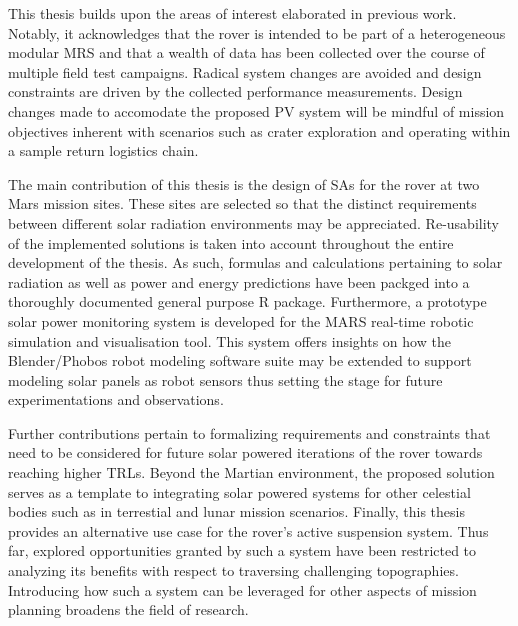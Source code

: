 This thesis builds upon the areas of interest elaborated in previous work. Notably, it acknowledges that the rover is intended to be part of a heterogeneous modular \ac{MRS} and that a wealth of data has been collected over the course of multiple field test campaigns. Radical system changes are avoided and design constraints are driven by the collected performance measurements. Design changes made to accomodate the proposed \ac{PV} system will be mindful of mission objectives inherent with scenarios such as crater exploration and operating within a sample return logistics chain.

The main contribution of this thesis is the design of \acp{SA} for the rover at two Mars mission sites. These sites are selected so that the distinct requirements between different solar radiation environments may be appreciated. Re-usability of the implemented solutions is taken into account throughout the entire development of the thesis. As such, formulas and calculations pertaining to solar radiation as well as power and energy predictions have been packged into a thoroughly documented general purpose R package. Furthermore, a prototype solar power monitoring system is developed for the MARS real-time robotic simulation and visualisation tool. This system offers insights on how the Blender/Phobos robot modeling software suite may be extended to support modeling solar panels as robot sensors thus setting the stage for future experimentations and observations.

Further contributions pertain to formalizing requirements and constraints that need to be considered for future solar powered iterations of the rover towards reaching higher \acp{TRL}. Beyond the Martian environment, the proposed solution serves as a template to integrating solar powered systems for other celestial bodies such as in terrestial and lunar mission scenarios. Finally, this thesis provides an alternative use case for the rover's active suspension system. Thus far, explored opportunities granted by such a system have been restricted to analyzing its benefits with respect to traversing challenging topographies. Introducing how such a system can be leveraged for other aspects of mission planning broadens the field of research.
